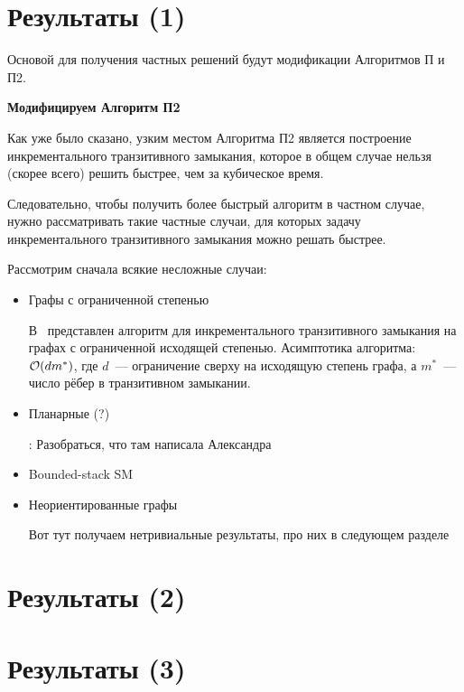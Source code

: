\section{Результаты (1)}

Основой для получения частных решений будут модификации Алгоритмов П и П2.

{\bf Модифицируем Алгоритм П2}

Как уже было сказано, узким местом Алгоритма П2 является построение инкрементального транзитивного замыкания, которое в общем случае нельзя (скорее всего) решить быстрее, чем за кубическое время.

Следовательно, чтобы получить более быстрый алгоритм в частном случае, нужно рассматривать такие частные случаи, для которых задачу инкрементального транзитивного замыкания можно решать быстрее.

Рассмотрим сначала всякие несложные случаи:

\begin{itemize}
    \item Графы с ограниченной степенью

    В~\cite{Yellin1993} представлен алгоритм для инкрементального транзитивного замыкания на графах с ограниченной исходящей степенью. Асимптотика алгоритма: $\mathcal{O}(d m^{*})$, где $d$~--- ограничение сверху на исходящую степень графа, а $m^{*}$~--- число рёбер в транзитивном замыкании.
    \item Планарные (?)

    \TODO: Разобраться, что там написала Александра 
    
    \item Bounded-stack SM 




    \item Неориентированные графы


    Вот тут получаем нетривиальные результаты, про них в следующем разделе
\end{itemize}





\section{Результаты (2)}



\section{Результаты (3)}


